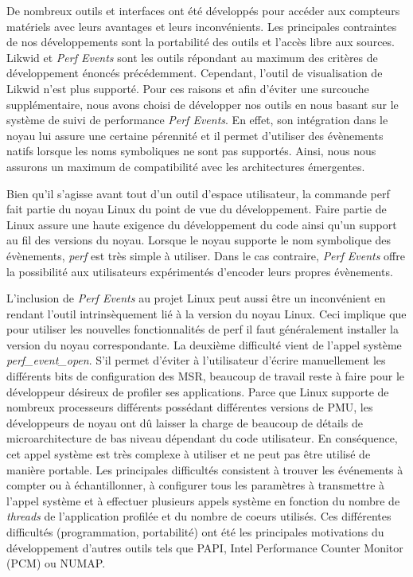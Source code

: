             De nombreux outils et interfaces ont été développés pour accéder aux compteurs matériels avec leurs avantages et leurs inconvénients. Les principales contraintes de nos développements sont la portabilité des outils et l'accès libre aux sources. Likwid et \textit{Perf Events} sont les outils répondant au maximum des critères de développement énoncés précédemment. Cependant, l'outil de visualisation de Likwid n'est plus supporté. Pour ces raisons et afin d'éviter une surcouche supplémentaire, nous avons choisi de développer nos outils en nous basant sur le système de suivi de performance \textit{Perf Events}. En effet, son intégration dans le noyau lui assure une certaine pérennité et il permet d'utiliser des évènements natifs lorsque les noms symboliques ne sont pas supportés. Ainsi, nous nous assurons un maximum de compatibilité avec les architectures émergentes.
            
            Bien qu'il s'agisse avant tout d'un outil d'espace utilisateur, la commande perf fait partie du noyau Linux du point de vue du développement. Faire partie de Linux assure une haute exigence du développement du code ainsi qu'un support au fil des versions du noyau. Lorsque le noyau supporte le nom symbolique des évènements, \textit{perf} est très simple à utiliser. Dans le cas contraire, \textit{Perf Events} offre la possibilité aux utilisateurs expérimentés d'encoder leurs propres évènements.
            
            L'inclusion de \textit{Perf Events} au projet Linux peut aussi être un inconvénient en rendant l'outil intrinsèquement lié à la version du noyau Linux. Ceci implique que pour utiliser les nouvelles fonctionnalités de perf il faut généralement installer la version du noyau correspondante. La deuxième difficulté vient de l'appel système \textit{perf\_event\_open}. S'il permet d'éviter à l'utilisateur d'écrire manuellement les différents bits de configuration des MSR, beaucoup de travail reste à faire pour le développeur désireux de profiler ses applications. Parce que Linux supporte de nombreux processeurs différents possédant différentes versions de PMU, les développeurs de noyau ont dû laisser la charge de beaucoup de détails de microarchitecture de bas niveau dépendant du code utilisateur. En conséquence, cet appel système est très complexe à utiliser et ne peut pas être utilisé de manière portable. Les principales difficultés consistent à trouver les événements à compter ou à échantillonner, à configurer tous les paramètres à transmettre à l'appel système et à effectuer plusieurs appels système en fonction du nombre de \textit{threads} de l'application profilée et du nombre de coeurs utilisés. Ces différentes difficultés (programmation, portabilité) ont été les principales motivations du développement d'autres outils tels que PAPI, Intel Performance Counter Monitor (PCM) ou NUMAP\cite{Selva2017}.

